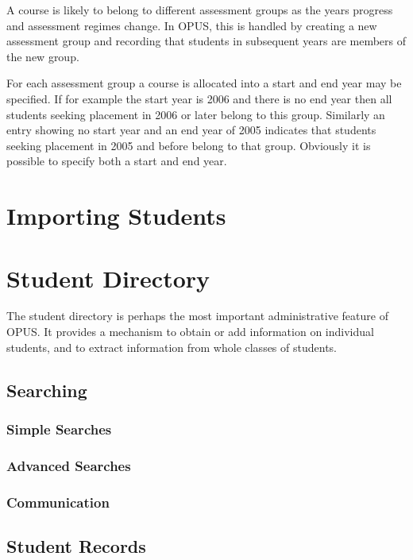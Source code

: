\documentclass[12 pt]{book}
\begin{document}
A course is likely to belong to different assessment groups as the years progress and
assessment regimes change. In OPUS, this is handled by creating a new assessment group
and recording that students in subsequent years are members of the new group.

For each assessment group a course is allocated into a start and end year may be
specified. If for example the start year is 2006 and there is no end year then all
students seeking placement in 2006 or later belong to this group. Similarly an entry
showing no start year and an end year of 2005 indicates that students seeking
placement in 2005 and before belong to that group. Obviously it is possible to
specify both a start and end year.

\chapter{Importing Students}

\chapter{Student Directory}

The student directory is perhaps the most important administrative feature of OPUS. It provides
a mechanism to obtain or add information on individual students, and to extract information from
whole classes of students.

\section{Searching}

\subsection{Simple Searches}

\subsection{Advanced Searches}

\subsection{Communication}

\section{Student Records}
\end{document}
